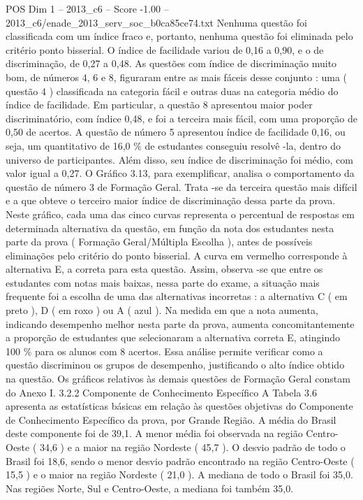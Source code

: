 \begin{textsample}{POS Dim 1 – 2013\_c6 – Score -1.00 – 2013\_c6/enade\_2013\_serv\_soc\_b0ca85ce74.txt}
Nenhuma questão foi classificada com um índice fraco e, portanto, nenhuma questão foi eliminada pelo critério ponto bisserial.
O índice de facilidade variou de 0,16 a 0,90, e o de discriminação, de 0,27 a 0,48.
As questões com índice de discriminação muito bom, de números 4, 6 e 8, figuraram entre as mais fáceis desse conjunto : uma ( questão 4 ) classificada na categoria fácil e outras duas na categoria médio do índice de facilidade.
Em particular, a questão 8 apresentou maior poder discriminatório, com índice 0,48, e foi a terceira mais fácil, com uma proporção de 0,50 de acertos.
A questão de número 5 apresentou índice de facilidade 0,16, ou seja, um quantitativo de 16,0 \% de estudantes conseguiu resolvê -la, dentro do universo de participantes.
Além disso, seu índice de discriminação foi médio, com valor igual a 0,27.
O Gráfico 3.13, para exemplificar, analisa o comportamento da questão de número 3 de Formação Geral.
Trata -se da terceira questão mais difícil e a que obteve o terceiro maior índice de discriminação dessa parte da prova.
Neste gráfico, cada uma das cinco curvas representa o percentual de respostas em determinada alternativa da questão, em função da nota dos estudantes nesta parte da prova ( Formação Geral/Múltipla Escolha ), antes de possíveis eliminações pelo critério do ponto bisserial.
A curva em vermelho corresponde à alternativa E, a correta para esta questão.
Assim, observa -se que entre os estudantes com notas mais baixas, nessa parte do exame, a situação mais frequente foi a escolha de uma das alternativas incorretas : a alternativa C ( em preto ), D ( em roxo ) ou A ( azul ).
Na medida em que a nota aumenta, indicando desempenho melhor nesta parte da prova, aumenta concomitantemente a proporção de estudantes que selecionaram a alternativa correta E, atingindo 100 \% para os alunos com 8 acertos.
Essa análise permite verificar como a questão discriminou os grupos de desempenho, justificando o alto índice obtido na questão.
Os gráficos relativos às demais questões de Formação Geral constam do Anexo I. 3.2.2 Componente de Conhecimento Específico A Tabela 3.6 apresenta as estatísticas básicas em relação às questões objetivas do Componente de Conhecimento Específico da prova, por Grande Região.
A média do Brasil deste componente foi de 39,1.
A menor média foi observada na região Centro-Oeste ( 34,6 ) e a maior na região Nordeste ( 45,7 ).
O desvio padrão de todo o Brasil foi 18,6, sendo o menor desvio padrão encontrado na região Centro-Oeste ( 15,5 ) e o maior na região Nordeste ( 21,0 ).
A mediana de todo o Brasil foi 35,0.
Nas regiões Norte, Sul e Centro-Oeste, a mediana foi também 35,0.

\end{textsample}
